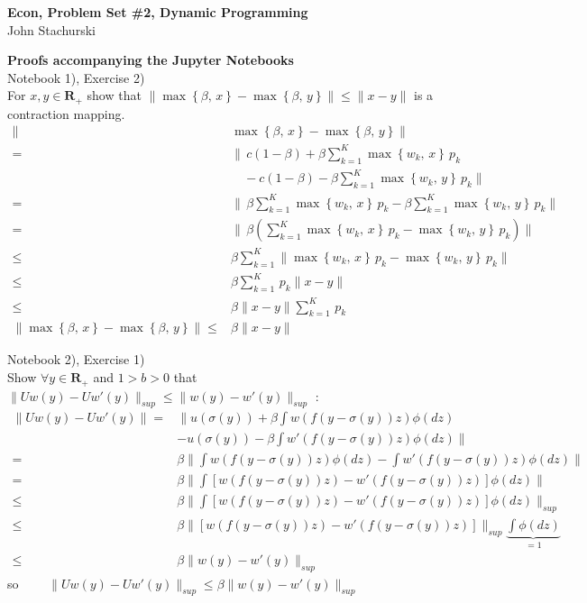 \documentclass[letterpaper,12pt]{article}
\theoremstyle{definition}
\begin{document}
\begin{flushleft}
   \textbf{\large{Econ, Problem Set \#2, Dynamic Programming}} \\[5pt] John Stachurski\\[5pt]

\end{flushleft}
\textbf{Proofs accompanying the Jupyter Notebooks} \\

Notebook 1), Exercise 2)\\

For $x ,y \in \mathbf{R}_+ $ show that $\| \max \left\{ \beta,\, x \right\} - \max \left\{ \beta,\, y\right\} \|\leq \| x - y \|$
   is a contraction mapping.
\begin{align*}
\| &\max \left\{ \beta,\, x \right\} - \max \left\{ \beta,\, y \right\}\|\\
 =& \| \, c(1- \beta) +\beta \sum_{k=1}^K 
\max \left\{ w_k,\, x \right\}\, p_k \\
&\quad - c(1- \beta) - \beta \sum_{k=1}^K 
\max \left\{ w_k,\, y \right\}\, p_k \| \\
=& \| \,  \beta \sum_{k=1}^K 
\max \left\{ w_k,\, x \right\}\, p_k  - \beta \sum_{k=1}^K 
\max \left\{ w_k,\, y \right\}\, p_k \| \\
=&\| \, \beta \left( \sum_{k=1}^K 
\max \left\{ w_k,\, x \right\} \, p_k -
\max \left\{ w_k,\, y \right\} \, p_k \right) \| \\
\leq& \beta \sum_{k=1}^K \|\max \left\{ w_k,\, x \right\} \, p_k - \max \left\{ w_k,\, y \right\} \, p_k \| \\
\leq &\beta \sum_{k=1}^K \, p_k \|x-y\| \\
\leq& \beta  \|x-y\|\sum_{k=1}^K \, p_k\\
\| \max \left\{ \beta,\, x \right\} - \max \left\{ \beta,\, y \right\} 
\|\leq& \beta  \|x-y\|
\end{align*}
\vspace*{.5cm}

Notebook 2), Exercise 1) \\

Show $\forall y \in \mathbf{R}_+$ and $ 1>b>0$ that $\| Uw(y) - Uw'(y)\|_{sup} \leq \| w(y) - w'(y) \|_{sup}$ :
\begin{align*}
\| Uw(y) - Uw'(y)\| =&\| u(\sigma(y)) + \beta \int w(f(y - \sigma(y))z) \phi(dz) \\
 &- u(\sigma(y)) - \beta \int w'(f(y - \sigma(y))z) \phi(dz)\| \\
=&\beta \| \int w(f(y - \sigma(y))z) \phi(dz)-  \int w'(f(y - \sigma(y))z) \phi(dz) \| \\
=& \beta \| \int \left[w(f(y - \sigma(y))z) - w'(f(y - \sigma(y))z) \right]\phi(dz) \| \\
\leq & \beta \| \int \left[w(f(y - \sigma(y))z) - w'(f(y - \sigma(y))z) \right]\phi(dz) \|_{sup} \\
\leq & \beta \| \left[w(f(y - \sigma(y))z) - w'(f(y - \sigma(y))z) \right]\|_{sup}\underbrace{\int \phi(dz)}_{=1} \\
\leq & \beta \| w(y) - w'(y)  \|_{sup}
\end{align*}
so $\qquad \| Uw(y) - Uw'(y)\|_{sup} \leq  \beta \| w(y) - w'(y) \|_{sup}$
\end{document}
